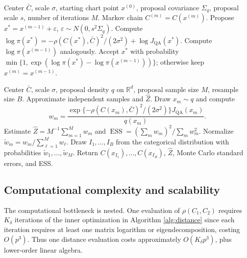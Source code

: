 \documentclass[
  12pt]{article}
\newcommand{\R}{\mathbb R}
\newcommand{\QA}{\mathrm{QA}}
\newcommand{\NR}{\mathcal N^{\mathrm R}_{\mathrm{QA}}}
\newcommand{\ess}{\operatorname{ESS}}
\begin{document}
\begin{algorithm}[H]
\caption{Metropolis--Hastings sampler for $\NR(\bar C,\sigma)$}
\label{alg:mh_sampler}
\begin{algorithmic}[1]
\Require Center $\bar C$, scale $\sigma$, starting chart point $x^{(0)}$, proposal covariance $\Sigma_q$, proposal scale $s$, number of iterations $M$.
\Ensure Markov chain $C^{(m)}=C(x^{(m)})$.
    \State Propose $x^*=x^{(m-1)}+\varepsilon$, $\varepsilon\sim N(0,s^2\Sigma_q)$.
    \State Compute $\log\pi(x^*)=-\rho(C(x^*),\bar C)^2/(2\sigma^2)+\log J_{\QA}(x^*)$.
    \State Compute $\log\pi(x^{(m-1)})$ analogously.
    \State Accept $x^*$ with probability $\min\{1,\exp(\log\pi(x^*)-\log\pi(x^{(m-1)}))\}$; otherwise keep $x^{(m)}=x^{(m-1)}$.
\EndFor
\end{algorithmic}
\end{algorithm}

\begin{algorithm}[H]
\caption{Sampling-importance-resampling (SIR) sampler and normalizing-constant estimator}
\label{alg:sir_sampler}
\begin{algorithmic}[1]
\Require Center $\bar C$, scale $\sigma$, proposal density $q$ on $\R^d$, proposal sample size $M$, resample size $B$.
\Ensure Approximate independent samples and $\widehat Z$.
    \State Draw $x_m\sim q$ and compute
    \[
    w_m=\frac{\exp\{-\rho(C(x_m),\bar C)^2/(2\sigma^2)\}J_{\QA}(x_m)}{q(x_m)}.
    \]
\EndFor
\State Estimate $\widehat Z=M^{-1}\sum_{m=1}^M w_m$ and $\ess=(\sum_m w_m)^2/\sum_m w_m^2$.
\State Normalize $\widetilde w_m=w_m/\sum_{\ell=1}^M w_{\ell}$.
\State Draw $I_1,\ldots,I_B$ from the categorical distribution with probabilities $\widetilde w_1,\ldots,\widetilde w_M$.
\State Return $C(x_{I_1}),\ldots,C(x_{I_B})$, $\widehat Z$, Monte Carlo standard errors, and ESS.
\end{algorithmic}
\end{algorithm}


\subsection{Computational complexity and scalability}\label{sec:complexity}

The computational bottleneck is nested. One evaluation of $\rho(C_1,C_2)$ requires $K_{\delta}$ iterations of the inner optimization in Algorithm \ref{alg:distance} since each iteration requires at least one matrix logarithm or eigendecomposition, costing $O(p^3)$. Thus one distance evaluation costs approximately $O(K_{\delta}p^3)$, plus lower-order linear algebra.
\end{document}
